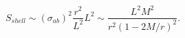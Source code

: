 \begin{equation}
S_{shell} \sim  (\sigma_{ab})^2  \frac{r^2}{L^2} L^2
\sim \frac{L^2M^2}{r^2(1-2M/r)^2}.
\end{equation}

